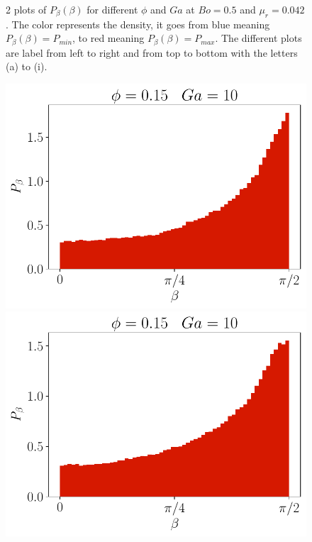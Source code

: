 \begin{figure}[h!]
    \caption{2 plots of $P_{\beta}(\beta)$ for different $\phi$ and $Ga$ at $Bo = 0.5$ and $\mu_r = 0.042$. The color represents the density, it goes from blue meaning $P_{\beta}(\beta)= P_{min}$, to red meaning $P_{\beta}(\beta) = P_{max}$. The different plots are label from left to right and from top to bottom with the letters (a) to (i).} 
\end{figure} 
\begin{figure}[h!]
    \centering
    \includegraphics[height =\size]{image/N_10/beta/2DMAP_beta_dmin_10_Bo0_5PHI0_15mu_r0_042Ga10.pdf}
    \includegraphics[height =\size]{image/N_10/beta/2DMAP_beta_dmin_10_Bo1PHI0_15mu_r0_042Ga10.pdf}


\end{figure}
